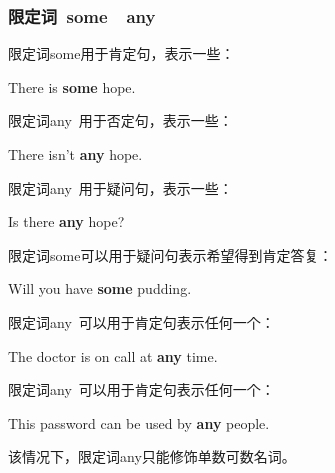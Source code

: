 \documentclass[UTF8]{ctexart}
\newcommand{\littf}[1]{{\hspace{3pt}\ttfamily #1}}
\begin{document}
\subsubsection{限定词~\littf{some}~~\littf{any}}
    限定词\littf{some}用于肯定句，表示一些：
    \begin{center}
        \large\ttfamily
        There is \textbf{some} hope.\\[6mm]
    \end{center}
    限定词\littf{any~}用于否定句，表示一些：
    \begin{center}
        \large\ttfamily
        There isn't \textbf{any} hope.\\[6mm]
    \end{center}
    限定词\littf{any~}用于疑问句，表示一些：
    \begin{center}
        \large\ttfamily
        Is there \textbf{any} hope?\\[6mm]
    \end{center}
    限定词\littf{some}可以用于疑问句表示希望得到肯定答复：
    \begin{center}
        \large\ttfamily
        Will you have \textbf{some} pudding.\\[6mm]
    \end{center}
    限定词\littf{any~}可以用于肯定句表示任何一个：
    \begin{center}
        \large\ttfamily
        The doctor is on call at \textbf{any} time.\\[6mm]
    \end{center}
    限定词\littf{any~}可以用于肯定句表示任何一个：
    \begin{center}
        \large\ttfamily
        This password can be used by \textbf{any} people.\\[6mm]
    \end{center}
    该情况下，限定词\littf{any}只能修饰单数可数名词。

\newpage
\end{document}
